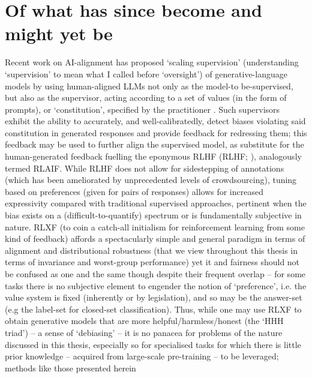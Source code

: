 \section*{Of what has since become and might yet be}
%
%
Recent work on AI-alignment has proposed `scaling supervision' (understanding `supervision' to mean
what I called before `oversight') of generative-language models by using human-aligned LLMs not
only as the model-to be-supervised, but also as the supervisor, acting according to a set of values
(in the form of prompts), or `constitution', specified by the practitioner
\citep{bowman2022measuring, bai2022constitutional}.
%
Such supervisors exhibit the ability to accurately, and well-calibratedly, detect biases violating
said constitution in generated responses and provide feedback for redressing them; this feedback
may be used to further align the supervised model, as substitute for the human-generated feedback
fuelling the eponymous \acl{RLHF} (\acs{RLHF}; \cite{christiano2017deep, stiennon2020learning,
bai2022training}), analogously termed \acf{RLAIF}.
%
While \ac{RLHF} does not allow for sidestepping of annotations (which has been ameliorated by
unprecedented levels of crowdsourcing), tuning based on preferences (given for pairs of responses)
allows for increased expressivity compared with traditional supervised approaches, pertinent when
the bias exists on a (difficult-to-quantify) spectrum or is fundamentally subjective in nature.
%
RLXF (to coin a catch-all initialism for reinforcement learning from some kind of feedback) affords
a spectacularly simple and general paradigm in terms of alignment and distributional robustness
(that we view throughout this thesis in terms of invariance and worst-group performance) yet it and
fairness should not be confused as one and the same though despite their frequent overlap -- for
some tasks there is no subjective element to engender the notion of `preference', i.e. the value
system is fixed (inherently or by legislation), and so may be the answer-set (e.g the label-set for
closed-set classification). 
%
Thus, while one may use RLXF to obtain generative models that are more helpful/harmless/honest (the
`HHH triad') -- a sense of `debiasing' -- it is no panacea for problems of the nature discussed in
this thesis, especially so for specialised tasks for which there is little prior knowledge --
acquired from large-scale pre-training -- to be leveraged; methods like those presented herein
